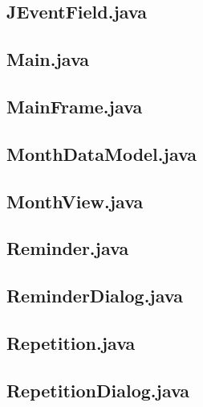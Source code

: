 \documentclass{article}
\begin{document}


\subsection{JEventField.java}



\subsection{Main.java}



\subsection{MainFrame.java}



\subsection{MonthDataModel.java}



\subsection{MonthView.java}



\subsection{Reminder.java}



\subsection{ReminderDialog.java}



\subsection{Repetition.java}



\subsection{RepetitionDialog.java}
\end{document}
